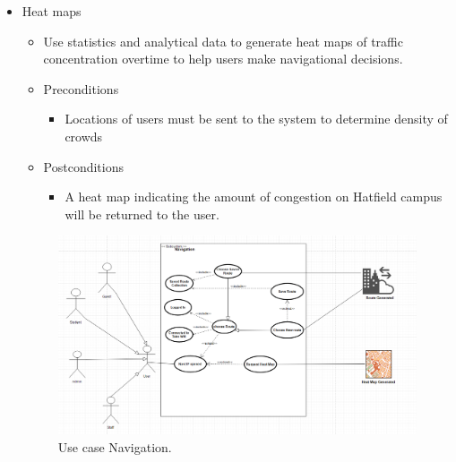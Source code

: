 \documentclass[12pt]{article}
\begin{document}
\begin{enumerate}
\begin{itemize}
				\item Heat maps
				\begin{itemize}
					\item Use statistics and analytical data to generate heat maps of traffic concentration overtime to help users make navigational decisions.
					\item Preconditions
					\begin{itemize}
						\item Locations of users must be sent to the system to determine density of crowds
					\end{itemize}
					\item Postconditions
					\begin{itemize}
						\item A heat map indicating the amount of congestion on Hatfield campus will be returned to the user.
					\end{itemize}
				\end{itemize}
				\begin{figure}
				    \includegraphics[width=\linewidth]{useCaseNavigation.png}
				    \caption{Use case Navigation.}
  \label{fig:Navigation}
				\end{figure}
			\end{itemize}	
			

\end{enumerate}
\end{document}
